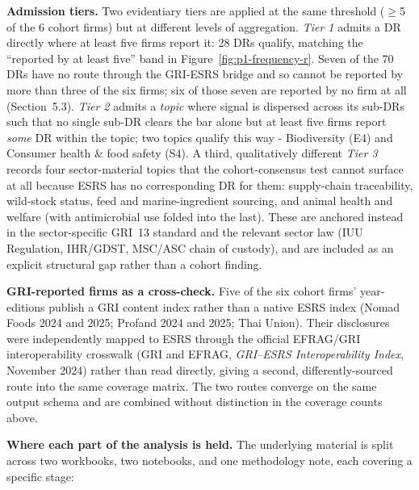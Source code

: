 \documentclass[
]{article}
\begin{document}
\textbf{Admission tiers.} Two evidentiary tiers are applied at the same
threshold ($\geq$5 of the 6 cohort firms) but at different levels of
aggregation. \emph{Tier 1} admits a DR directly where at least five firms
report it: 28 DRs qualify, matching the ``reported by at least five'' band in
Figure~\ref{fig:p1-frequency-r}. Seven of the 70 DRs have no route through the GRI-ESRS
bridge and so cannot be reported by more than three of the six firms; six of
those seven are reported by no firm at all (Section~5.3). \emph{Tier 2} admits a \emph{topic} where
signal is dispersed across its sub-DRs such that no single sub-DR clears the
bar alone but at least five firms report \emph{some} DR within the topic;
two topics qualify this way - Biodiversity (E4) and Consumer health \&
food safety (S4). A third, qualitatively different \emph{Tier 3} records
four sector-material topics that the cohort-consensus test cannot surface at
all because ESRS has no corresponding DR for them: supply-chain traceability,
wild-stock status, feed and marine-ingredient sourcing, and animal health and
welfare (with antimicrobial use folded into the last). These are anchored instead in the sector-specific GRI~13
standard and the relevant sector law (IUU Regulation, IHR/GDST, MSC/ASC chain
of custody), and are included as an explicit structural gap rather than a
cohort finding.

\textbf{GRI-reported firms as a cross-check.} Five of the six cohort firms'
year-editions publish a GRI content index rather than a native ESRS index
(Nomad Foods 2024 and 2025; Profand 2024 and 2025; Thai Union). Their
disclosures were independently mapped to ESRS through the official EFRAG/GRI
interoperability crosswalk (GRI and EFRAG, \emph{GRI--ESRS Interoperability
Index}, November 2024) rather than read directly, giving a second,
differently-sourced route into the same coverage matrix. The two routes
converge on the same output schema and are combined without distinction in
the coverage counts above.

\textbf{Where each part of the analysis is held.} The underlying material is
split across two workbooks, two notebooks, and one methodology note, each
covering a specific stage:
\end{document}
